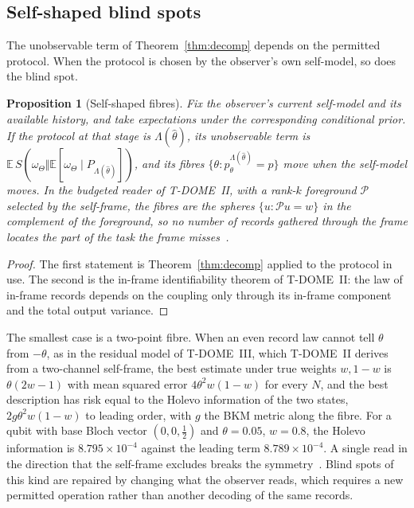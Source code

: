 \documentclass[12pt]{article}
\newtheorem{proposition}[theorem]{Proposition}
\theoremstyle{definition}
\theoremstyle{remark}
\newcommand{\E}{\mathbb E}
\begin{document}
\subsection{Self-shaped blind spots}

The unobservable term of Theorem~\ref{thm:decomp} depends on the permitted protocol. When the protocol is chosen by the observer's own self-model, so does the blind spot.

\begin{proposition}[Self-shaped fibres]\label{prop:selfshaped}
Fix the observer's current self-model and its available history, and take expectations under the corresponding conditional prior. If the protocol at that stage is $\Lambda(\hat\theta)$, its unobservable term is $\E\,S(\omega_\Theta\Vert\E[\omega_\Theta\mid P_{\Lambda(\hat\theta)}])$, and its fibres $\{\theta:p^{\Lambda(\hat\theta)}_\theta=p\}$ move when the self-model moves. In the budgeted reader of T-DOME~II, with a rank-$k$ foreground $\mathcal P$ selected by the self-frame, the fibres are the spheres $\{u:\mathcal Pu=w\}$ in the complement of the foreground, so no number of records gathered through the frame locates the part of the task the frame misses~\cite{TDOMEII}.
\end{proposition}

\begin{proof}
The first statement is Theorem~\ref{thm:decomp} applied to the protocol in use. The second is the in-frame identifiability theorem of T-DOME~II: the law of in-frame records depends on the coupling only through its in-frame component and the total output variance.
\end{proof}

The smallest case is a two-point fibre. When an even record law cannot tell $\theta$ from $-\theta$, as in the residual model of T-DOME~III, which T-DOME~II derives from a two-channel self-frame, the best estimate under true weights $w,1-w$ is $\theta(2w-1)$ with mean squared error $4\theta^2w(1-w)$ for every $N$, and the best description has risk equal to the Holevo information of the two states, $2g\theta^2w(1-w)$ to leading order, with $g$ the BKM metric along the fibre. For a qubit with base Bloch vector $(0,0,\tfrac12)$ and $\theta=0.05$, $w=0.8$, the Holevo information is $8.795\times10^{-4}$ against the leading term $8.789\times10^{-4}$. A single read in the direction that the self-frame excludes breaks the symmetry~\cite{TDOMEII}. Blind spots of this kind are repaired by changing what the observer reads, which requires a new permitted operation rather than another decoding of the same records.
\end{document}
